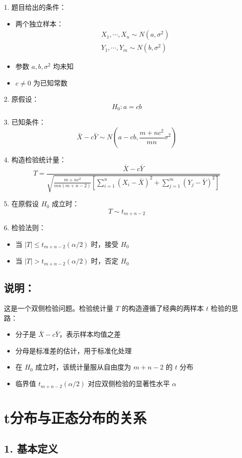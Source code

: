 \documentclass[UTF8]{report}
\theoremstyle{MyLineTheoremStyle} %
\theoremstyle{MyBlockTheoremStyle} %
\theoremstyle{MySubsubsectionStyle} %
\begin{document}
1. 题目给出的条件：
   \begin{itemize}
   \item 两个独立样本：
      \begin{align*}
      &X_1,\cdots,X_n \sim N(a,\sigma^2) \\
      &Y_1,\cdots,Y_m \sim N(b,\sigma^2)
      \end{align*}
   \item 参数 $a,b,\sigma^2$ 均未知
   \item $c\neq0$ 为已知常数
   \end{itemize}

2. 原假设：
   $$H_0: a=cb$$

3. 已知条件：
   $$\bar{X}-c\bar{Y} \sim N(a-cb, \frac{m+nc^2}{mn}\sigma^2)$$

4. 构造检验统计量：
   $$T = \frac{\bar{X}-c\bar{Y}}{\sqrt{\frac{m+nc^2}{mn(m+n-2)}[\sum_{i=1}^n(X_i-\bar{X})^2 + \sum_{j=1}^m(Y_j-\bar{Y})^2]}}$$

5. 在原假设 $H_0$ 成立时：
   $$T \sim t_{m+n-2}$$

6. 检验法则：
   \begin{itemize}
   \item 当 $|T| \leq t_{m+n-2}(\alpha/2)$ 时，接受 $H_0$
   \item 当 $|T| > t_{m+n-2}(\alpha/2)$ 时，否定 $H_0$
   \end{itemize}

\subsection*{说明：}
这是一个双侧检验问题。检验统计量 $T$ 的构造遵循了经典的两样本 $t$ 检验的思路：
\begin{itemize}
\item 分子是 $\bar{X}-c\bar{Y}$，表示样本均值之差
\item 分母是标准差的估计，用于标准化处理
\item 在 $H_0$ 成立时，该统计量服从自由度为 $m+n-2$ 的 $t$ 分布
\item 临界值 $t_{m+n-2}(\alpha/2)$ 对应双侧检验的显著性水平 $\alpha$
\end{itemize}

\section*{t分布与正态分布的关系}

\subsection*{1. 基本定义}
\end{document}
